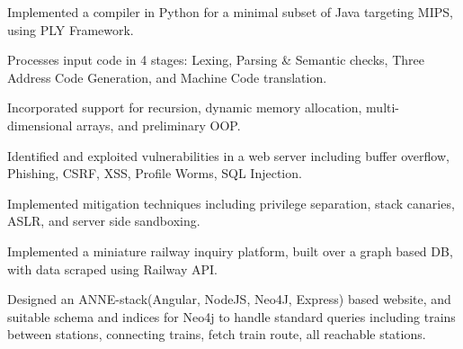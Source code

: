 \documentclass[a4paper]{norm-resume}
\begin{document}
 
\begin{tightitemize}
    \small
    {
    \item Implemented a compiler in Python for a minimal subset of Java targeting MIPS, using PLY Framework.
    \item Processes input code in 4 stages: Lexing, Parsing \& Semantic checks, Three Address Code Generation, and Machine Code translation.
    \item Incorporated support for recursion, dynamic memory allocation, multi-dimensional arrays, and preliminary OOP.
    }
\end{tightitemize}

\vspace{5mm}

     
\begin{tightitemize}
    \small
    {
    \item Identified and exploited vulnerabilities in a web server including buffer overflow, Phishing, CSRF, XSS, Profile Worms, SQL Injection.
    \item Implemented mitigation techniques including privilege separation, stack canaries, ASLR, and server side sandboxing.
    }
\end{tightitemize}

\vspace{5mm}

 
\begin{tightitemize}
        \small
        {
        \item Implemented a miniature railway inquiry platform, built over a graph based DB, with data scraped using Railway API.
        \item Designed an ANNE-stack(Angular, NodeJS, Neo4J, Express) based website, and suitable schema and indices for Neo4j to handle standard queries including trains between stations, connecting trains, fetch train route, all reachable stations.
        }
\end{tightitemize}
\end{document}
